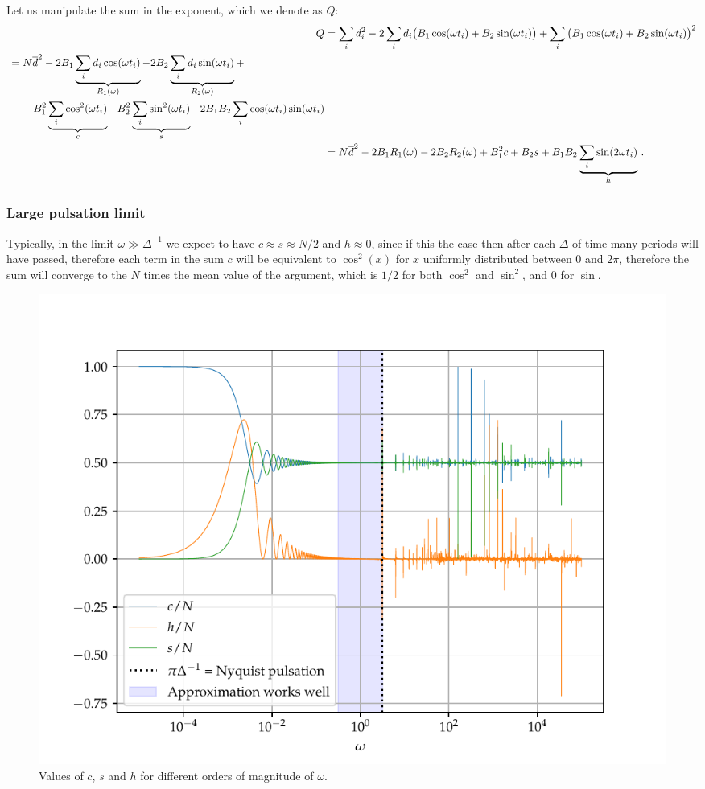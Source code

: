 \documentclass[main.tex]{subfiles}
\begin{document}
Let us manipulate the sum in the exponent, which we denote as \(Q\): 
%
\begin{align}
Q &= \sum _{i} d_i^2 -2 \sum _i d_i \qty(B_1  \cos(\omega t_i) + B_2 \sin(\omega t_i))
+ \sum _{i} \qty(B_1  \cos(\omega t_i) + B_2 \sin(\omega t_i))^2  \\
\begin{split}
&= N \overline{d}^2 
-2 B_1 \underbrace{\sum _{i} d_i \cos(\omega t_i)}_{R_1(\omega )}
-2 B_2 \underbrace{\sum _{i} d_i \sin(\omega t_i)}_{R_2(\omega )} + \\
&\phantom{=}\ 
+ B_1^2 \underbrace{\sum _{i} \cos^2( \omega t_i)}_{c}
+ B_2^2 \underbrace{\sum _{i} \sin^2( \omega t_i)}_{s}
+ 2 B_1 B_2 \sum _{i} \cos(\omega t_i) \sin(\omega t_i) 
\end{split}  \\
&= N \overline{d}^2 - 2 B_1 R_1(\omega ) -2 B_2 R_2(\omega ) + B_1^2 c + B_2 s + B_1 B_2 \underbrace{\sum _{i} \sin(2 \omega t_i)}_{h}
\,.
\end{align}

\subsubsection{Large pulsation limit}

Typically, in the limit \(\omega \gg \Delta^{-1} \) we expect to have \(c \approx s \approx N/2\) and \(h \approx 0\), since if this the case then after each \(\Delta \) of time many periods will have passed, therefore each term in the sum \(c\) will be equivalent to \(\cos^2(x)\) for \(x\) uniformly distributed between \(0\) and \(2 \pi \), therefore the sum will converge to the \(N\) times the mean value of the argument, which is \(1/2\) for both \(\cos^2\) and \(\sin^2\), and \(0\) for \(\sin\).

\begin{figure}[ht]
\centering
\includegraphics[width=\textwidth]{figures/large_pulsation}
\caption{Values of \(c\), \(s\) and \(h\) for different orders of magnitude of \(\omega \).}
\label{fig:large_pulsation}
\end{figure}
\end{document}
